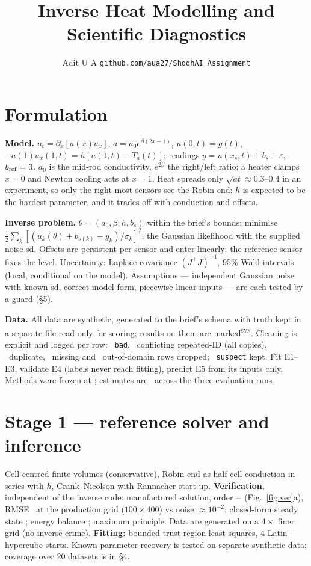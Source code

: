 \documentclass[10pt]{article}
\title{\vspace{-1.4cm}Inverse Heat Modelling and Scientific Diagnostics}
\author{Adit U A \quad \small\texttt{github.com/aua27/ShodhAI\_Assignment}}
\date{\vspace{-0.6cm}}
\newcommand{\syn}{\textsuperscript{\textsc{syn}}}
\begin{document}
\maketitle

\section{Formulation}
\textbf{Model.} $u_t=\partial_x[a(x)u_x]$, $a=a_0e^{\beta(2x-1)}$, $u(0,t)=g(t)$,
$-a(1)u_x(1,t)=h[u(1,t)-T_a(t)]$; readings $y=u(x_s,t)+b_s+\varepsilon$, $b_{\rm ref}=0$.
$a_0$ is the mid-rod conductivity, $e^{2\beta}$ the right/left ratio; a heater clamps $x{=}0$ and Newton
cooling acts at $x{=}1$. Heat spreads only $\sqrt{at}\approx0.3$--$0.4$ in an experiment, so only the
right-most sensors see the Robin end: $h$ is expected to be the hardest parameter, and it trades off with
conduction and offsets.

\textbf{Inverse problem.} $\theta=(a_0,\beta,h,b_s)$ within the brief's bounds; minimise
$\tfrac12\sum_k[(u_k(\theta)+b_{s(k)}-y_k)/\sigma_k]^2$, the Gaussian likelihood with the supplied noise sd.
Offsets are persistent per sensor and enter linearly; the reference sensor fixes the level.
Uncertainty: Laplace covariance $(J^\top J)^{-1}$, 95\% Wald intervals (local, conditional on the model).
Assumptions --- independent Gaussian noise with known sd, correct model form, piecewise-linear inputs --- are
each tested by a guard (\S5).

\textbf{Data.} All data are synthetic, generated to the brief's schema with
truth kept in a separate file read only for scoring; results on them are marked\syn. Cleaning is explicit
and logged per row: \ClnBad\ \texttt{bad}, \ClnConflict\ conflicting repeated-ID (all copies), \ClnDup\
duplicate, \ClnMissing\ missing and \ClnTime\ out-of-domain rows dropped; \ClnSuspect\ \texttt{suspect}
kept. Fit E1--E3, validate E4 (labels never reach fitting), predict E5 from its inputs only. Methods were
frozen at \texttt{\FreezeCommit}; estimates are \RunsIdentical\ across the three evaluation runs.

\section{Stage 1 --- reference solver and inference}
Cell-centred finite volumes (conservative), Robin end as half-cell conduction in series with $h$,
Crank--Nicolson with Rannacher start-up. \textbf{Verification}, independent of the inverse code:
manufactured solution, order \OrdMin--\OrdMax\ (Fig.~\ref{fig:ver}a), RMSE \MmsErrHundred\ at the production
grid ($100\times400$) vs noise $\approx10^{-2}$; closed-form steady state \SteadyErr; energy balance
\EnergyDefect; maximum principle. Data are generated on a $4\times$ finer grid (no inverse crime).
\textbf{Fitting:} bounded trust-region least squares, 4 Latin-hypercube starts. Known-parameter recovery is
tested on separate synthetic data; coverage over 20 datasets is in \S4.
\end{document}
